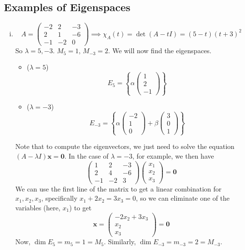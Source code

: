 \documentclass{article}
\begin{document}
	\subsection{Examples of Eigenspaces}
	\begin{enumerate}[(i)]
		\item 
		\[ A = \begin{pmatrix}
			-2 & 2 & -3 \\ 2 & 1 & -6 \\ -1 & -2 & 0
		\end{pmatrix} \implies \chi_A(t) = \det(A - tI) = (5-t)(t+3)^2 \]
		So $\lambda = 5, -3$. $M_5 = 1$, $M_{-3} = 2$. We will now find the eigenspaces.
		\begin{itemize}
			\item ($\lambda = 5$)
			\[ E_5 = \left\{ \alpha\begin{pmatrix}
				1 \\ 2 \\ -1
			\end{pmatrix} \right\} \]
			\item ($\lambda = -3$)
			\[ E_{-3} = \left\{ \alpha\begin{pmatrix}
				-2 \\ 1 \\ 0
			\end{pmatrix} + \beta\begin{pmatrix}
				3 \\ 0 \\ 1
			\end{pmatrix} \right\} \]
		\end{itemize}
		Note that to compute the eigenvectors, we just need to solve the equation $(A - \lambda I)\bm x = \bm 0$. In the case of $\lambda = -3$, for example, we then have
		\[ \begin{pmatrix}
			1 & 2 & -3 \\ 2 & 4 & -6 \\ -1 & -2 & 3
		\end{pmatrix} \begin{pmatrix}
			x_1 \\ x_2 \\ x_3
		\end{pmatrix} = \bm 0 \]
		We can use the first line of the matrix to get a linear combination for $x_1, x_2, x_3$, specifically $x_1 + 2x_2 = 3x_3 = 0$, so we can eliminate one of the variables (here, $x_1$) to get
		\[ \bm x = \begin{pmatrix}
			-2x_2 + 3x_3 \\ x_2 \\ x_3
		\end{pmatrix} = \bm 0 \]
		Now, $\dim E_5 = m_5 = 1 = M_5$. Similarly, $\dim E_{-3} = m_{-3} = 2 = M_{-3}$.
		

\end{enumerate}
\end{document}

